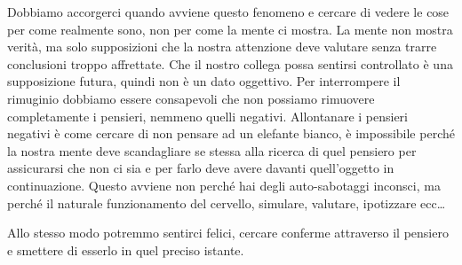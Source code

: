 \documentclass[12pt]{book} %
\begin{document}
Dobbiamo accorgerci quando avviene questo fenomeno e cercare di vedere le cose per come realmente
sono, non per come la mente ci mostra. La mente non mostra verità, ma solo supposizioni che la nostra attenzione deve
valutare senza trarre conclusioni troppo affrettate. Che il nostro collega possa sentirsi controllato è una
supposizione futura, quindi non è un dato oggettivo. Per interrompere il rimuginio dobbiamo essere consapevoli che non
possiamo rimuovere completamente i pensieri, nemmeno quelli negativi. Allontanare i pensieri negativi è come cercare di
non pensare ad un elefante bianco, è impossibile perché la nostra mente deve scandagliare se stessa alla ricerca di
quel pensiero per assicurarsi che non ci sia e per farlo deve avere davanti quell'oggetto in continuazione. Questo
avviene non perché hai degli auto-sabotaggi inconsci, ma perché il naturale funzionamento del cervello, simulare,
valutare, ipotizzare ecc…

\bigskip

Allo stesso modo potremmo sentirci felici, cercare conferme attraverso il pensiero e smettere di esserlo in quel preciso
istante. 
\end{document}
